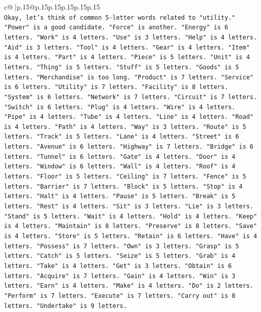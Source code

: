\documentclass{article}
\begin{document}
{\begin{supertabular}{c@{$\;$}|p{.15\linewidth}@{}p{.15\linewidth}p{.15\linewidth}p{.15\linewidth}p{.15\linewidth}p{.15\linewidth}}
{{{\\ 
\texttt{Okay, let's think of common 5{-}letter words related to "utility." "Power" is a good candidate. "Force" is another. "Energy" is 6 letters. "Work" is 4 letters. "Use" is 3 letters. "Help" is 4 letters. "Aid" is 3 letters. "Tool" is 4 letters. "Gear" is 4 letters. "Item" is 4 letters. "Part" is 4 letters. "Piece" is 5 letters. "Unit" is 4 letters. "Thing" is 5 letters. "Stuff" is 5 letters. "Goods" is 5 letters. "Merchandise" is too long. "Product" is 7 letters. "Service" is 6 letters. "Utility" is 7 letters. "Facility" is 8 letters. "System" is 6 letters. "Network" is 7 letters. "Circuit" is 7 letters. "Switch" is 6 letters. "Plug" is 4 letters. "Wire" is 4 letters. "Pipe" is 4 letters. "Tube" is 4 letters. "Line" is 4 letters. "Road" is 4 letters. "Path" is 4 letters. "Way" is 3 letters. "Route" is 5 letters. "Track" is 5 letters. "Lane" is 4 letters. "Street" is 6 letters. "Avenue" is 6 letters. "Highway" is 7 letters. "Bridge" is 6 letters. "Tunnel" is 6 letters. "Gate" is 4 letters. "Door" is 4 letters. "Window" is 6 letters. "Wall" is 4 letters. "Roof" is 4 letters. "Floor" is 5 letters. "Ceiling" is 7 letters. "Fence" is 5 letters. "Barrier" is 7 letters. "Block" is 5 letters. "Stop" is 4 letters. "Halt" is 4 letters. "Pause" is 5 letters. "Break" is 5 letters. "Rest" is 4 letters. "Sit" is 3 letters. "Lie" is 3 letters. "Stand" is 5 letters. "Wait" is 4 letters. "Hold" is 4 letters. "Keep" is 4 letters. "Maintain" is 8 letters. "Preserve" is 8 letters. "Save" is 4 letters. "Store" is 5 letters. "Retain" is 6 letters. "Have" is 4 letters. "Possess" is 7 letters. "Own" is 3 letters. "Grasp" is 5 letters. "Catch" is 5 letters. "Seize" is 5 letters. "Grab" is 4 letters. "Take" is 4 letters. "Get" is 3 letters. "Obtain" is 6 letters. "Acquire" is 7 letters. "Gain" is 4 letters. "Win" is 3 letters. "Earn" is 4 letters. "Make" is 4 letters. "Do" is 2 letters. "Perform" is 7 letters. "Execute" is 7 letters. "Carry out" is 8 letters. "Undertake" is 9 letters.} \\
\\ 
}}}
\end{supertabular}}
\end{document}
